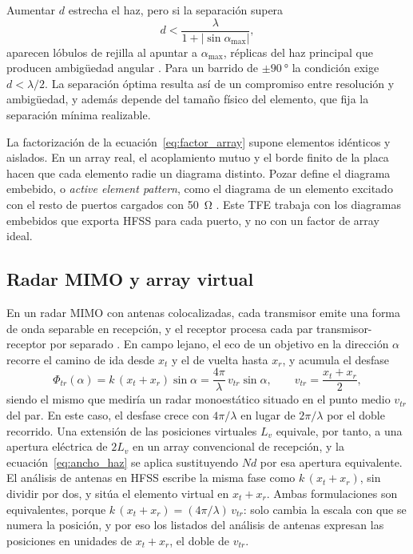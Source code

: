 \documentclass[11pt,a4paper]{article}
\begin{document}
Aumentar $d$ estrecha el haz, pero si la separación supera
\begin{equation}
    d < \frac{\lambda}{1 + |\sin\alpha_\mathrm{max}|},
    \label{eq:lobulos_rejilla}
\end{equation}
aparecen lóbulos de rejilla al apuntar a $\alpha_\mathrm{max}$, réplicas del haz principal que
producen ambigüedad angular \cite{mailloux2005phased}. Para un barrido de $\pm\SI{90}{\degree}$ la
condición exige $d < \lambda/2$. La separación óptima resulta así de un compromiso entre
resolución y ambigüedad, y además depende del tamaño físico del elemento, que fija la separación
mínima realizable.

La factorización de la ecuación~\eqref{eq:factor_array} supone elementos idénticos y aislados. En
un array real, el acoplamiento mutuo y el borde finito de la placa hacen que cada elemento radie
un diagrama distinto. Pozar define el diagrama embebido, o \textit{active element pattern}, como
el diagrama de un elemento excitado con el resto de puertos cargados con \SI{50}{\ohm}
\cite{pozar1994active}. Este TFE trabaja con los diagramas embebidos que exporta HFSS para cada
puerto, y no con un factor de array ideal.

\subsection{Radar MIMO y array virtual}\label{sec:mimo}
En un radar MIMO con antenas colocalizadas, cada transmisor emite una forma de onda separable en
recepción, y el receptor procesa cada par transmisor-receptor por separado \cite{li2007mimo}. En
campo lejano, el eco de un objetivo en la dirección $\alpha$ recorre el camino de ida desde
$x_t$ y el de vuelta hasta $x_r$, y acumula el desfase
\begin{equation}
    \Phi_{tr}(\alpha) = k\,(x_t + x_r)\sin\alpha = \frac{4\pi}{\lambda}\, v_{tr} \sin\alpha,
    \qquad
    v_{tr} = \frac{x_t + x_r}{2},
    \label{eq:posicion_virtual}
\end{equation}
siendo el mismo que mediría un radar monoestático situado en el punto medio $v_{tr}$ del par.
En este caso, el desfase crece con $4\pi/\lambda$ en lugar de $2\pi/\lambda$
por el doble recorrido. Una extensión de las posiciones virtuales $L_v$ equivale, por tanto, a
una apertura eléctrica de $2L_v$ en un array convencional de recepción, y la
ecuación~\eqref{eq:ancho_haz} se aplica sustituyendo $Nd$ por esa apertura equivalente. El análisis de antenas en HFSS escribe la misma fase como
$k\,(x_t+x_r)$, sin dividir por dos, y sitúa el elemento virtual en $x_t+x_r$. Ambas formulaciones son
equivalentes, porque $k\,(x_t+x_r) = (4\pi/\lambda)\,v_{tr}$: solo cambia la escala con que se numera la
posición, y por eso los listados del análisis de antenas expresan las posiciones en unidades de $x_t+x_r$,
el doble de $v_{tr}$.
\end{document}
